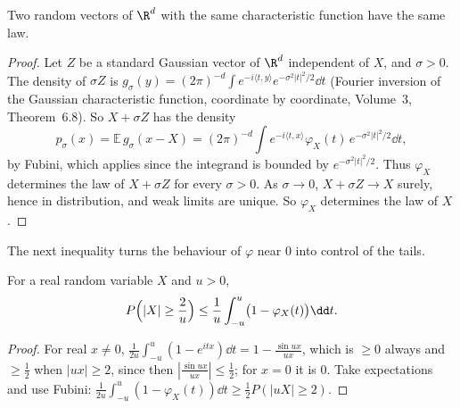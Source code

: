 \begin{lemma}[uniqueness]\label{lem:chfunique}
Two random vectors of $\R^d$ with the same characteristic function have the same law.
\end{lemma}
\begin{proof}
Let $Z$ be a standard Gaussian vector of $\R^d$ independent of $X$, and $\sigma>0$. The density of $\sigma Z$ is
$g_\sigma(y)=(2\pi)^{-d}\int e^{-i\langle t,y\rangle}e^{-\sigma^2|t|^2/2}\dd t$ (Fourier inversion of the Gaussian characteristic function, coordinate by
coordinate, Volume~3, Theorem~6.8). So $X+\sigma Z$ has the density
\[
p_\sigma(x)=\mathbb E\,g_\sigma(x-X)=(2\pi)^{-d}\int e^{-i\langle t,x\rangle}\varphi_X(t)\,e^{-\sigma^2|t|^2/2}\dd t,
\]
by Fubini, which applies since the integrand is bounded by $e^{-\sigma^2|t|^2/2}$. Thus $\varphi_X$ determines the law of $X+\sigma Z$ for every $\sigma>0$.
As $\sigma\to0$, $X+\sigma Z\to X$ surely, hence in distribution, and weak limits are unique. So $\varphi_X$ determines the law of $X$.
\end{proof}

The next inequality turns the behaviour of $\varphi$ near $0$ into control of the tails.

\begin{lemma}\label{lem:truncineq}
For a real random variable $X$ and $u>0$,
\[
P\Bigl(|X|\ge\frac2u\Bigr)\le\frac1u\int_{-u}^u\bigl(1-\varphi_X(t)\bigr)\dd t.
\]
\end{lemma}
\begin{proof}
For real $x\ne0$, $\frac1{2u}\int_{-u}^u(1-e^{itx})\dd t=1-\frac{\sin ux}{ux}$, which is $\ge0$ always and $\ge\frac12$ when $|ux|\ge2$, since then
$|\frac{\sin ux}{ux}|\le\frac12$; for $x=0$ it is $0$. Take expectations and use Fubini: $\frac1{2u}\int_{-u}^u(1-\varphi_X(t))\dd t\ge\frac12P(|uX|\ge2)$.
\end{proof}

